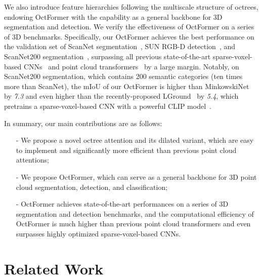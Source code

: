 \documentclass[acmtog,screen,authorversion]{acmart}
\begin{document}
We also introduce feature hierarchies following the multiscale structure of octrees, endowing OctFormer with the capability as a general backbone for 3D segmentation and detection.
We verify the effectiveness of OctFormer on a series of 3D benchmarks.
Specifically, our OctFormer achieves the best performance on the validation set of ScanNet segmentation~\cite{Dai2017a}, SUN RGB-D detection~\cite{Song2015}, and ScanNet200 segmentation~\cite{Rozen2022}, surpassing all previous state-of-the-art sparse-voxel-based CNNs~\cite{Choy2019,Wang2017,Graham2018} and point cloud transformers~\cite{Lai2022,Wu2022} by a large margin.
Notably, on ScanNet200 segmentation, which contains 200 semantic categories (ten times more than ScanNet), the mIoU of our OctFormer is higher than MinkowskiNet~\cite{Choy2019} by \emph{7.3} and even higher than the recently-proposed LGround~\cite{Rozen2022} by \emph{5.4}, which pretrains a sparse-voxel-based CNN with a powerful CLIP model~\cite{Radford2021}.


In summary, our main contributions are as follows:
\begin{itemize}[leftmargin=10pt,itemsep=2pt]
  \item[-] We propose a novel octree attention and its dilated variant, which are easy to implement and significantly more efficient than previous point cloud attentions;
  \item[-] We propose OctFormer, which can serve as a general backbone for 3D point cloud segmentation, detection, and classification;
  \item[-] OctFormer achieves state-of-the-art performances on a series of 3D segmentation and detection benchmarks, and the computational efficiency of OctFormer is much higher than previous point cloud transformers and even surpasses highly optimized sparse-voxel-based CNNs.
\end{itemize}
 \section{Related Work} \label{sec:related}
\end{document}
